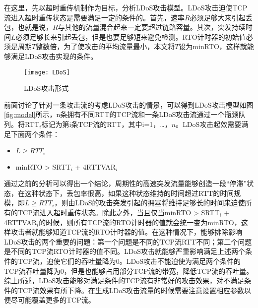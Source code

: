 在这里，先以超时重传机制作为目标，分析LDoS攻击模型。LDoS攻击迫使TCP流进入超时重传状态是需要满足一定的条件的。首先，速率$R$必须足够大来引起丢包，也就是说，$R$与其他的流量混合起来一定要超过链路容量。其次，突发持续时间$L$必须足够长来引起丢包，但是也要足够短来避免检测。RTO计时器的初始值必须是周期$T$整数倍，为了使攻击的平均流量最小，本文将$T$设为minRTO，这样就能够满足LDoS攻击实现的条件。

\begin{figure}
    \centering
    \texttt{[image: LDoS]}
    \caption{LDoS攻击形式}
    \label{fig:LDoS}
\end{figure}

前面讨论了针对一条攻击流的考虑LDoS攻击的情景，可以得到LDoS攻击模型如图\ref{fig:model}所示，n条拥有不同RTT的TCP流和一条LDoS攻击流通过一个瓶颈队列。将RTT$_{i}$标记为第i条TCP流的RTT，其中i=1，…，$n$。LDoS攻击起效需要满足下面两个条件：
\begin{itemize}
    \item $L \geq RTT_i $
    \item minRTO > SRTT$_i$ + 4RTTVAR$_i$
\end{itemize}

通过之前的分析可以得出一个结论，周期性的高速突发流量能够创造一段“停滞”状态，在这种状态下，丢包率很高，如果这种状态维持的时间超过RTT的时间规模，即$L \geq RTT_i$，则由LDoS的攻击突发引起的拥塞将维持足够长的时间来迫使所有的TCP流进入超时重传状态。除此之外，当且仅当minRTO > SRTT$_i$ + 4RTTVAR$_i$的时候，则所有TCP流的RTO计时器的值就会统一变为minRTO，这样攻击者就能够知道TCP流的RTO计时器的值。在这种情况下，能够排除影响LDoS攻击的两个重要的问题：第一个问题是不同的TCP流RTT不同；第二个问题是不同的TCP流RTO计时器的值不同。LDoS攻击就能够严重影响满足上述两个条件的TCP流，迫使它们的吞吐量降为0。LDoS攻击不能迫使为满足两个条件的TCP流吞吐量降为0，但是也能够占用部分TCP流的带宽，降低TCP流的吞吐量。综上所述，LDoS攻击能够对满足条件的TCP流有非常好的攻击效果，对不满足条件的TCP流效果有所下降。在生成LDoS攻击流量的时候需要注意设置相应参数以便尽可能覆盖更多的TCP流。





